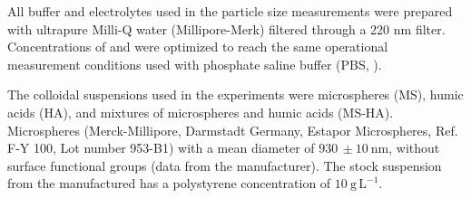 \documentclass[journal=langd5,manuscript=article]{achemso}
\begin{document}



All buffer and electrolytes used in the particle size measurements were prepared with ultrapure
Milli-Q water (Millipore-Merk)  filtered through a 220 nm filter. Concentrations of   and  were optimized to reach the same operational measurement conditions used with phosphate saline buffer (PBS, ).


The colloidal suspensions used in the experiments were microspheres (MS), humic acids (HA), and mixtures of microspheres and humic acids (MS-HA).
Microspheres (Merck-Millipore, Darmstadt Germany, Estapor Microspheres, Ref. F-Y 100, Lot number 953-B1)
with a mean diameter of $930 \, \pm 10~\mathrm{nm}$, without surface functional groups (data from the manufacturer).
The stock suspension from the manufactured  has a polystyrene concentration of $10~\mathrm{g\,L^{-1}}$.
\end{document}

